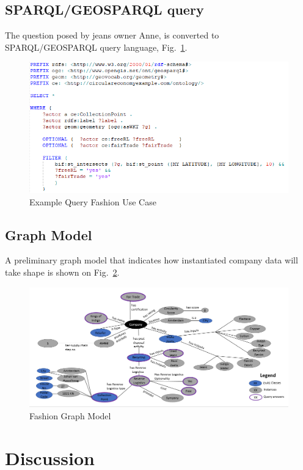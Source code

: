 \documentclass[runningheads,a4paper]{llncs}
\makeatletter
\def\maxwidth#1{\ifdim\Gin@nat@width>#1 #1\else\Gin@nat@width\fi}
\makeatother
\begin{document}
\subsection{SPARQL/GEOSPARQL query}

The question posed by jeans owner Anne, is converted to SPARQL/GEOSPARQL query language, Fig.~\ref{_Ref490912191}. 
\begin{figure}[h!]
\centering
\includegraphics[width=\maxwidth{\textwidth}]{./img/image4.png}
\cprotect\caption{Example Query Fashion Use Case}
\label{_Ref490912191}
\end{figure}


\subsection{Graph Model }

A preliminary graph model that indicates how instantiated company data will take shape is shown on Fig.~\ref{_Ref488768927}. 
\begin{figure}[h!]
\centering
\includegraphics[width=\maxwidth{\textwidth}]{./img/image5.png}
\cprotect\caption{Fashion Graph Model}
\label{_Ref488768927}
\end{figure}


\section{Discussion}
\end{document}
